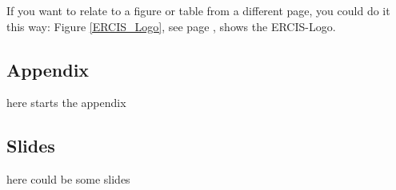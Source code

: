 \documentclass[a4paper, 12pt, titlepage, headsepline, listof = totoc, bibliography = totoc, numbers = noenddot]{scrartcl}
\begin{document}
If you want to relate to a figure or table from a different page, you could do it this way: Figure \ref{ERCIS_Logo}, see page \pageref{ERCIS_Logo}, shows the ERCIS-Logo.


\newpage

\begin{appendix}

\section{Appendix}
here starts the appendix

\subsection{Slides}
here could be some slides

\end{appendix}


\newpage
\listoffigures
\listoftables




\end{document}
